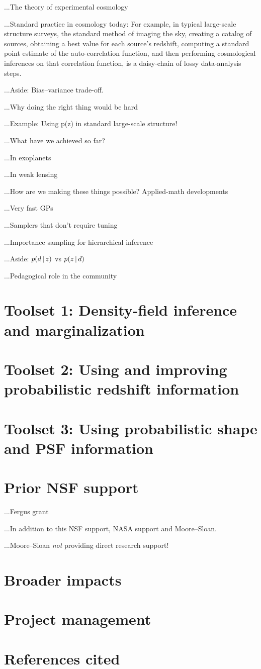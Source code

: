 \documentclass[12pt]{article}
\begin{document}
\sloppy\sloppypar

...The theory of experimental cosmology

...Standard practice in cosmology today:
For example, in typical large-scale structure surveys, the standard
method of imaging the sky, creating a catalog of sources, obtaining a
best value for each source's redshift, computing a standard point
estimate of the auto-correlation function, and then performing
cosmological inferences on that correlation function, is a daisy-chain
of lossy data-analysis steps.

...Aside:  Bias--variance trade-off.

...Why doing the right thing would be hard

...Example:  Using p(z) in standard large-scale structure!

...What have we achieved so far?

...In exoplanets

...In weak lensing

...How are we making these things possible?  Applied-math developments

...Very fast GPs

...Samplers that don't require tuning

...Importance sampling for hierarchical inference

...Aside:  $p(d\,|\, z)$ vs $p(z\,|\, d)$

...Pedagogical role in the community

\section*{Toolset 1: Density-field inference and marginalization}

\section*{Toolset 2: Using and improving probabilistic redshift information}

\section*{Toolset 3: Using probabilistic shape and PSF information}

\section*{Prior NSF support}

...Fergus grant

...In addition to this NSF support, NASA support and Moore--Sloan.

...Moore--Sloan \emph{not} providing direct research support!

\section*{Broader impacts}

\section*{Project management}

\section*{References cited}
\end{document}

